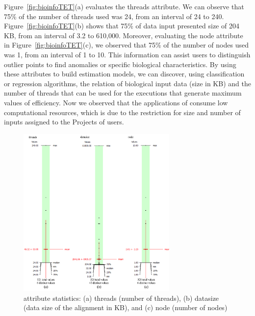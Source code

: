 Figure~\ref{fig:bioinfoTET}(a) evaluates the threads attribute. We can observe that 75\% of the number of threads used was 24, from an interval of 24 to 240. Figure~\ref{fig:bioinfoTET}(b) shows that 75\% of data input presented size of 204 KB, from an interval of 3.2 to 610,000. Moreover, evaluating the node attribute in Figure~\ref{fig:bioinfoTET}(c), we observed that 75\% of the number of nodes used was 1, from an interval of 1 to 10. This information can assist users to distinguish outlier points to find anomalies or specific biological characteristics. By using these attributes to build estimation models, we can discover, using classification or regression algorithms, the relation of biological input data (size in KB) and the number of threads that can be used for the executions that generate maximum values of efficiency. Now we observed that the applications of \system consume low computational resources, which is due to the restriction for size and number of inputs assigned to the Projects of users.

\begin{figure}[!htb]
\centering
\includegraphics[width=0.7\textwidth]{imgs/mlattributes.png}
\vspace{-12px}
\caption{\system attribute statistics: (a) threads (number of threads), (b) datasize (data size of the alignment in KB), and (c) node (number of nodes)}
\label{fig:mlattributes}
\end{figure}

